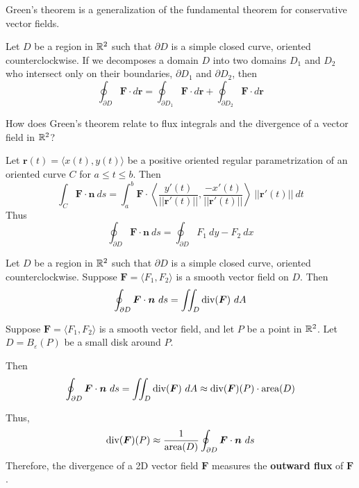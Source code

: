 \begin{remark}
    Green's theorem is a generalization of the fundamental theorem for conservative vector fields.
\end{remark}

\begin{theorem}
    Let $D$ be a region in $\mathbb{R}^2$ such that $\partial D$ is a simple closed curve, oriented counterclockwise.  If we decomposes a domain $D$ into two domains $D_1$ and $D_2$ who intersect only on their boundaries, $\partial D_1$ and $\partial D_2$, then
    $$\oint_{\partial D} \bm{F} \cdot d\bm{r} = \oint_{\partial D_1} \bm{F} \cdot d\bm{r} + \oint_{\partial D_2} \bm{F} \cdot d\bm{r}$$
    
    \end{theorem}

    
\begin{motivating}
How does Green's theorem relate to flux integrals and the divergence of a vector field in $\mathbb{R}^2$?
\end{motivating}


\begin{theorem}
    Let $\bm{r}(t) = \langle x(t), y(t)\rangle$ be a positive oriented regular parametrization of an oriented curve $C$ for $a \leq t \leq b$.  Then
    $$\int_C \bm{F} \cdot \bm{n} \ ds = \int_a^b \bm{F} \cdot \left\langle \frac{y'(t)}{||\bm{r}'(t)||}, \frac{-x'(t)}{||\bm{r}'(t)||} \right\rangle \ ||\bm{r}'(t)||\ dt$$
    Thus
    $$\oint_{\partial D} \bm{F} \cdot \bm{n} \ ds = \oint_{\partial D} F_1 \ dy - F_2 \ dx$$
    \end{theorem}

\begin{theorem}
    Let $D$ be a region in $\mathbb{R}^2$ such that $\partial D$ is a simple closed curve, oriented counterclockwise.  Suppose $\bm{F} = \langle F_1, F_2 \rangle$ is a smooth vector field on $D$.
    Then
    $$\oint_{\partial D} \bm{F} \cdot \bm{n} \ ds = \iint_D \textnormal{div}(\bm{F}) \ dA$$
        \end{theorem}

\begin{corollary}
    Suppose $\bm{F} = \langle F_1, F_2 \rangle$ is a smooth vector field, and let $P$ be a point in $\mathbb{R}^2$.  Let $D = B_\varepsilon(P)$ be a small disk around $P$. 
    
    Then
    $$\oint_{\partial D} \bm{F} \cdot \bm{n} \ ds = \iint_D \textnormal{div}(\bm{F}) \ dA \approx \textnormal{div}(\bm{F})(P) \cdot \textnormal{area}(D)$$

    Thus, $$\textnormal{div}(\bm{F})(P) \approx \frac{1}{\textnormal{area}(D)}\oint_{\partial D} \bm{F} \cdot \bm{n} \ ds$$
    Therefore, the divergence of a 2D vector field $\bm{F}$ measures the \textbf{outward flux} of $\bm{F}$.
    \end{corollary}

